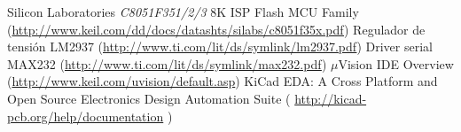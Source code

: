 \begin{thebibliography}{99}

 Silicon Laboratories \emph{C8051F351/2/3} 8K ISP Flash MCU Family (\url{http://www.keil.com/dd/docs/datashts/silabs/c8051f35x.pdf})
 Regulador de tensi\'on LM2937 (\url{http://www.ti.com/lit/ds/symlink/lm2937.pdf})
 Driver serial MAX232 (\url{http://www.ti.com/lit/ds/symlink/max232.pdf})
 $\mu$Vision IDE Overview (\url{http://www.keil.com/uvision/default.asp})
 KiCad EDA: A Cross Platform and Open Source Electronics Design Automation Suite ( \url{http://kicad-pcb.org/help/documentation} )

\end{thebibliography}